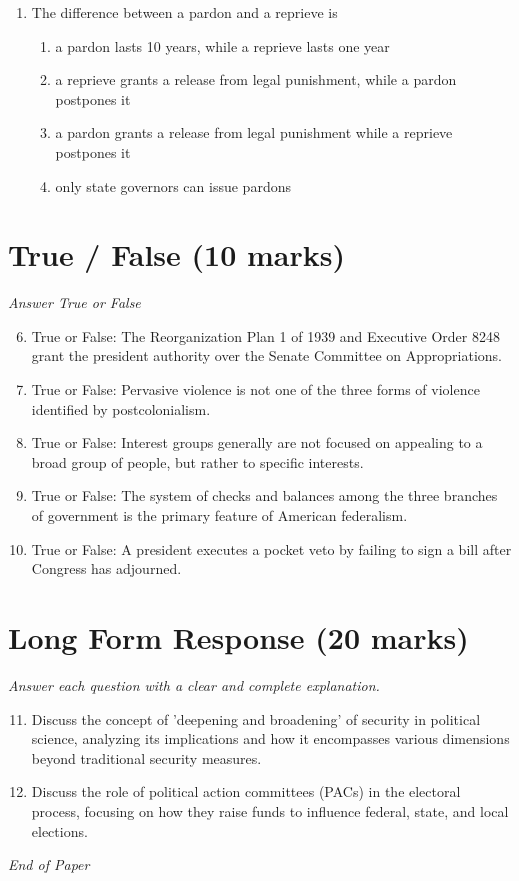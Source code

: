 \documentclass[12pt]{article}
\begin{document}
\begin{enumerate}[label=\arabic*.]
\begin{enumerate}[label=(\alph*)]
    \item extend voting rights to racial minorities and women
    \item apply most Bill of Rights protections to state law
    \item hasten the integration of public schools
\end{enumerate}
\item The difference between a pardon and a reprieve is
\begin{enumerate}[label=(\alph*)]
    \item a pardon lasts 10 years, while a reprieve lasts one year
    \item a reprieve grants a release from legal punishment, while a pardon postpones it
    \item a pardon grants a release from legal punishment while a reprieve postpones it
    \item only state governors can issue pardons
\end{enumerate}
\end{enumerate}

\section*{True / False (10 marks)}
\textit{Answer True or False}
\begin{enumerate}[label=\arabic*.]
\setcounter{enumi}{5}
\item True or False: The Reorganization Plan 1 of 1939 and Executive Order 8248 grant the president authority over the Senate Committee on Appropriations.
\item True or False: Pervasive violence is not one of the three forms of violence identified by postcolonialism.
\item True or False: Interest groups generally are not focused on appealing to a broad group of people, but rather to specific interests.
\item True or False: The system of checks and balances among the three branches of government is the primary feature of American federalism.
\item True or False: A president executes a pocket veto by failing to sign a bill after Congress has adjourned.
\end{enumerate}

\section*{Long Form Response (20 marks)}
\textit{Answer each question with a clear and complete explanation.}
\begin{enumerate}[label=\arabic*.]
\setcounter{enumi}{10}
\item Discuss the concept of 'deepening and broadening' of security in political science, analyzing its implications and how it encompasses various dimensions beyond traditional security measures.
\item Discuss the role of political action committees (PACs) in the electoral process, focusing on how they raise funds to influence federal, state, and local elections.
\end{enumerate}

\vfill
\noindent\textit{End of Paper}
\end{document}
